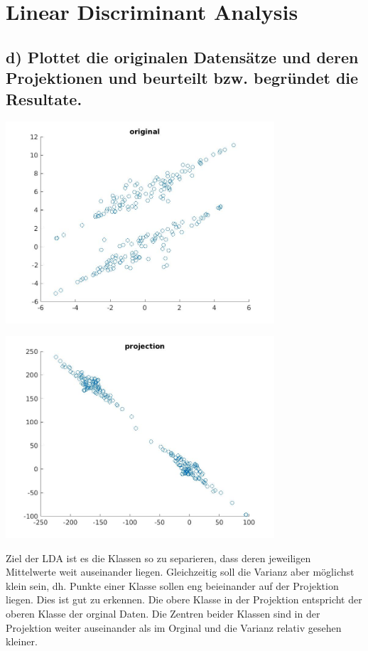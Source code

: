\documentclass[a4paper]{scrartcl}
\begin{document}
\section{Linear Discriminant Analysis}

\subsection*{d) Plottet die originalen Datensätze und deren Projektionen und beurteilt bzw. begründet die Resultate.}

\includegraphics[width=0.75\textwidth]{plots/4original.jpg}

\includegraphics[width=0.75\textwidth]{plots/4projection.jpg}


Ziel der LDA ist es die Klassen so zu separieren, dass deren jeweiligen Mittelwerte weit auseinander liegen. Gleichzeitig soll die Varianz aber möglichst klein sein, dh. Punkte einer Klasse sollen eng beieinander auf der Projektion liegen.
Dies ist gut zu erkennen. Die obere Klasse in der Projektion entspricht der oberen Klasse der orginal Daten.
Die Zentren beider Klassen sind in der Projektion weiter auseinander als im Orginal und die Varianz relativ gesehen kleiner. 
\end{document}
